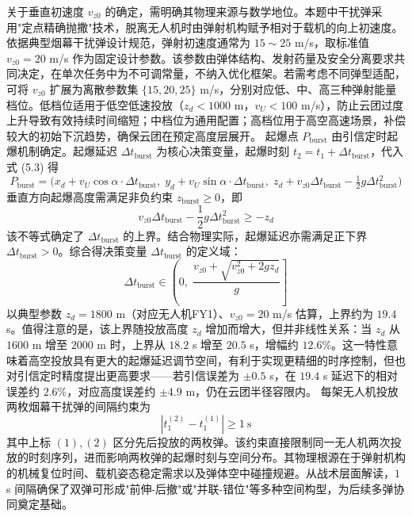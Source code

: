 \documentclass{JXUSTmodeling}
\begin{document}
关于垂直初速度 $v_{z0}$ 的确定，需明确其物理来源与数学地位。本题中干扰弹采用"定点精确抛撒"技术，脱离无人机时由弹射机构赋予相对于载机的向上初速度。依据典型烟幕干扰弹设计规范，弹射初速度通常为 $15\sim 25$ m/s，取标准值 $v_{z0}=20$ m/s 作为固定设计参数。该参数由弹体结构、发射药量及安全分离要求共同决定，在单次任务中为不可调常量，不纳入优化框架。若需考虑不同弹型适配，可将 $v_{z0}$ 扩展为离散参数集 $\{15, 20, 25\}$ m/s，分别对应低、中、高三种弹射能量档位。低档位适用于低空低速投放（$z_d<1000$ m，$v_U<100$ m/s），防止云团过度上升导致有效持续时间缩短；中档位为通用配置；高档位用于高空高速场景，补偿较大的初始下沉趋势，确保云团在预定高度层展开。
起爆点 $P_{\text{burst}}$ 由引信定时起爆机制确定。起爆延迟 $\Delta t_{\text{burst}}$ 为核心决策变量，起爆时刻 $t_2=t_1+\Delta t_{\text{burst}}$，代入式 (5.3) 得
\begin{equation}
P_{\text{burst}}=\bigl(x_d+v_U\cos\alpha\cdot\Delta t_{\text{burst}},\; y_d+v_U\sin\alpha\cdot\Delta t_{\text{burst}},\; z_d+v_{z0}\Delta t_{\text{burst}}-\tfrac{1}{2}g\Delta t_{\text{burst}}^2\bigr) \tag{5.4}
\end{equation}
垂直方向起爆高度需满足非负约束 $z_{\text{burst}}\geq 0$，即
\begin{equation}
v_{z0}\Delta t_{\text{burst}}-\frac{1}{2}g\Delta t_{\text{burst}}^2\geq -z_d \tag{5.5}
\end{equation}
该不等式确定了 $\Delta t_{\text{burst}}$ 的上界。结合物理实际，起爆延迟亦需满足正下界 $\Delta t_{\text{burst}}>0$。综合得决策变量 $\Delta t_{\text{burst}}$ 的定义域：
\begin{equation}
\Delta t_{\text{burst}}\in\left(0,\; \frac{v_{z0}+\sqrt{v_{z0}^2+2gz_d}}{g}\right] \tag{5.6}
\end{equation}
以典型参数 $z_d=1800$ m（对应无人机FY1）、$v_{z0}=20$ m/s 估算，上界约为 $19.4$ s。值得注意的是，该上界随投放高度 $z_d$ 增加而增大，但并非线性关系：当 $z_d$ 从 $1600$ m 增至 $2000$ m 时，上界从 $18.2$ s 增至 $20.5$ s，增幅约 $12.6\%$。这一特性意味着高空投放具有更大的起爆延迟调节空间，有利于实现更精细的时序控制，但也对引信定时精度提出更高要求——若引信误差为 $\pm 0.5$ s，在 $19.4$ s 延迟下的相对误差约 $2.6\%$，对应高度误差约 $\pm 4.9$ m，仍在云团半径容限内。
每架无人机投放两枚烟幕干扰弹的间隔约束为
\begin{equation}
|t_{1}^{(2)}-t_{1}^{(1)}|\geq 1\ \text{s} \tag{5.7}
\end{equation}
其中上标 $(1),(2)$ 区分先后投放的两枚弹。该约束直接限制同一无人机两次投放的时刻序列，进而影响两枚弹的起爆时刻与空间分布。其物理根源在于弹射机构的机械复位时间、载机姿态稳定需求以及弹体空中碰撞规避。从战术层面解读，$1$ s 间隔确保了双弹可形成"前伸-后撤"或"并联-错位"等多种空间构型，为后续多弹协同奠定基础。
\end{document}

